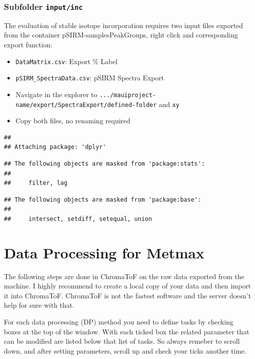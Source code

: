 \documentclass[]{book}
\providecommand{\tightlist}{%
  \setlength{\itemsep}{0pt}\setlength{\parskip}{0pt}}
\theoremstyle{definition}
\theoremstyle{definition}
\theoremstyle{definition}
\theoremstyle{remark}
\begin{document}
\subsection{\texorpdfstring{Subfolder
\texttt{input/inc}}{Subfolder input/inc}}\label{subfolder-inputinc}

The evaluation of stable isotope incorporation requires two input files
exported from the container pSIRM-samplesPeakGroups, right click and
corresponding export function:

\begin{itemize}
\tightlist
\item
  \texttt{DataMatrix.csv}: Export \% Label
\item
  \texttt{pSIRM\_SpectraData.csv}: pSIRM Spectra Export
\item
  Navigate in the explorer to
  \texttt{.../mauiproject-name/export/SpectraExport/defined-folder} and
  \texttt{xy}
\item
  Copy both files, no renaming required
\end{itemize}

\begin{verbatim}
## 
## Attaching package: 'dplyr'
\end{verbatim}

\begin{verbatim}
## The following objects are masked from 'package:stats':
## 
##     filter, lag
\end{verbatim}

\begin{verbatim}
## The following objects are masked from 'package:base':
## 
##     intersect, setdiff, setequal, union
\end{verbatim}

\chapter{Data Processing for Metmax}\label{metmaxproc}

The following steps are done in ChromaToF on the raw data exported from
the machine. I highly recommend to create a local copy of your data and
then import it into ChromaToF. ChromaToF is not the fastest software and
the server doesn't help for sure with that.

For each data processing (DP) method you need to define tasks by
checking boxes at the top of the window. With each ticked box the
related parameter that can be modified are listed below that list of
tasks. So always remeber to scroll down, and after setting parameters,
scroll up and check your ticks another time.
\end{document}
